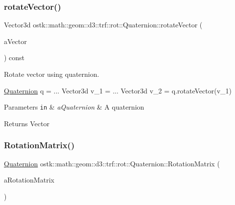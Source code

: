 \subsubsection{\texorpdfstring{rotate\+Vector()}{rotateVector()}}
{\footnotesize\ttfamily Vector3d ostk\+::math\+::geom\+::d3\+::trf\+::rot\+::\+Quaternion\+::rotate\+Vector (\begin{DoxyParamCaption}\item[{const Vector3d \&}]{a\+Vector }\end{DoxyParamCaption}) const}



Rotate vector using quaternion. 


\begin{DoxyCode}
\hyperlink{classostk_1_1math_1_1geom_1_1d3_1_1trf_1_1rot_1_1_quaternion_ad9fd7d8eb5effb4d4e0394bbb5bb86dc}{Quaternion} q = ...
Vector3d v\_1 = ...
Vector3d v\_2 = q.rotateVector(v\_1)
\end{DoxyCode}



\begin{DoxyParams}[1]{Parameters}
\mbox{\tt in}  & {\em a\+Quaternion} & A quaternion \\
\hline
\end{DoxyParams}
\begin{DoxyReturn}{Returns}
Vector 
\end{DoxyReturn}
\mbox{\label{classostk_1_1math_1_1geom_1_1d3_1_1trf_1_1rot_1_1_quaternion_acaf18c1140ca8380d9368feabfd99875}} 
\subsubsection{\texorpdfstring{Rotation\+Matrix()}{RotationMatrix()}}
{\footnotesize\ttfamily \hyperlink{classostk_1_1math_1_1geom_1_1d3_1_1trf_1_1rot_1_1_quaternion}{Quaternion} ostk\+::math\+::geom\+::d3\+::trf\+::rot\+::\+Quaternion\+::\+Rotation\+Matrix (\begin{DoxyParamCaption}\item[{const \hyperlink{classostk_1_1math_1_1geom_1_1d3_1_1trf_1_1rot_1_1_rotation_matrix}{rot\+::\+Rotation\+Matrix} \&}]{a\+Rotation\+Matrix }\end{DoxyParamCaption})\hspace{0.3cm}{\ttfamily [static]}}



